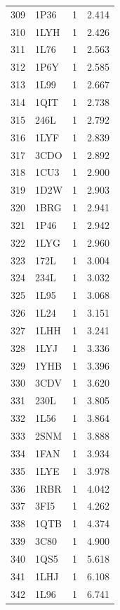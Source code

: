 \begin{longtable}{r l r r}
309 & 1P36 & 1 & 2.414 \\
310 & 1LYH & 1 & 2.426 \\
311 & 1L76 & 1 & 2.563 \\
312 & 1P6Y & 1 & 2.585 \\
313 & 1L99 & 1 & 2.667 \\
314 & 1QIT & 1 & 2.738 \\
315 & 246L & 1 & 2.792 \\
316 & 1LYF & 1 & 2.839 \\
317 & 3CDO & 1 & 2.892 \\
318 & 1CU3 & 1 & 2.900 \\
319 & 1D2W & 1 & 2.903 \\
320 & 1BRG & 1 & 2.941 \\
321 & 1P46 & 1 & 2.942 \\
322 & 1LYG & 1 & 2.960 \\
323 & 172L & 1 & 3.004 \\
324 & 234L & 1 & 3.032 \\
325 & 1L95 & 1 & 3.068 \\
326 & 1L24 & 1 & 3.151 \\
327 & 1LHH & 1 & 3.241 \\
328 & 1LYJ & 1 & 3.336 \\
329 & 1YHB & 1 & 3.396 \\
330 & 3CDV & 1 & 3.620 \\
331 & 230L & 1 & 3.805 \\
332 & 1L56 & 1 & 3.864 \\
333 & 2SNM & 1 & 3.888 \\
334 & 1FAN & 1 & 3.934 \\
335 & 1LYE & 1 & 3.978 \\
336 & 1RBR & 1 & 4.042 \\
337 & 3FI5 & 1 & 4.262 \\
338 & 1QTB & 1 & 4.374 \\
339 & 3C80 & 1 & 4.900 \\
340 & 1QS5 & 1 & 5.618 \\
341 & 1LHJ & 1 & 6.108 \\
342 & 1L96 & 1 & 6.741 \\
\hline
\end{longtable}
